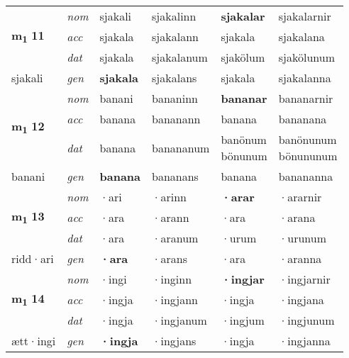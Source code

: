 \begin{longtable}[l]{X>{\footnotesize\itshape}XXXXX}
\multirow{3}{*}{{{\textbf{m{\textsubscript{1}}} \Large{\textbf{11}}}}} & nom & sjakali & sjakalinn & \textbf{sjakalar} & sjakalarnir \\*
 & acc & sjakala & sjakalann & sjakala & sjakalana \\*
 & dat & sjakala & sjakalanum & sjakölum & sjakölunum \\*
 {\footnotesize{sjakali}} & gen & \textbf{sjakala} & sjakalans & sjakala & sjakalanna \\
\cmidrule{1-6}

\multirow{3}{*}{{{\textbf{m{\textsubscript{1}}} \Large{\textbf{12}}}}} & nom & banani & bananinn & \textbf{bananar} & bananarnir \\*
 & acc & banana & bananann & banana & bananana \\*
 & dat & banana & banananum & \specialcell{banönum\\ bönunum} & \specialcell{banönunum\\ bönununum} \\*
 {\footnotesize{banani}} & gen & \textbf{banana} & bananans & banana & banananna \\
\cmidrule{1-6}

\multirow{3}{*}{{{\textbf{m{\textsubscript{1}}} \Large{\textbf{13}}}}} & nom & ·ari & ·arinn & \textbf{·arar} & ·ararnir \\*
 & acc & ·ara & ·arann & ·ara & ·arana \\*
 & dat & ·ara & ·aranum & ·urum & ·urunum \\*
 {\footnotesize{ridd\allowbreak ·ari}} & gen & \textbf{·ara} & ·arans & ·ara & ·aranna \\
\cmidrule{1-6}

\multirow{3}{*}{{{\textbf{m{\textsubscript{1}}} \Large{\textbf{14}}}}} & nom & ·ingi & ·inginn & \textbf{·ingjar} & ·ingjarnir \\*
 & acc & ·ingja & ·ingjann & ·ingja & ·ingjana \\*
 & dat & ·ingja & ·ingjanum & ·ingjum & ·ingjunum \\*
 {\footnotesize{ætt\allowbreak ·ingi}} & gen & \textbf{·ingja} & ·ingjans & ·ingja & ·ingjanna \\
\cmidrule{1-6}


\end{longtable}
